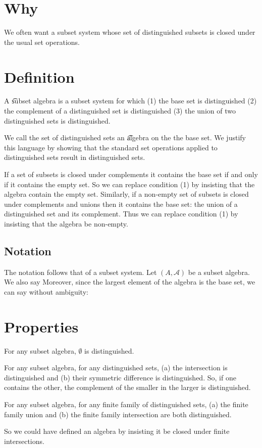 

\section*{Why}

We often want a subset system whose set of distinguished subsets is closed under the usual set operations.

\section*{Definition}

A \t{subset algebra} is a subset system for which (1) the base set is distinguished (2) the complement of a distinguished set is distinguished (3) the union of two distinguished sets is distinguished.

We call the set of distinguished sets an \t{algebra} on the the base set.
We justify this language by showing that the standard set operations applied to distinguished sets result in distinguished sets.

If a set of subsets is closed under complements it contains the base set if and only if it contains the empty set.
So we can replace condition (1) by insisting that the algebra contain the empty set.
Similarly, if a non-empty set of subsets is closed under complements and unions then it contains the base set: the union of a distinguished set and its complement.
Thus we can replace condition (1) by insisting that the algebra be non-empty.

\subsection*{Notation}

The notation follows that of a subset system.
Let $(A, \mathcal{A} )$ be a subset algebra.
We also say 
Moreover, since the largest element of the
algebra is the base set, we can say without
ambiguity: 

\section*{Properties}

\begin{proposition}
For any subset algebra, $\emptyset$ is distinguished.\end{proposition}
\begin{proposition}
For any subset algebra,
for any distinguished sets,
(a) the intersection is distinguished and
(b) their symmetric difference is distinguished.
So, if one contains the other, the complement
of the smaller in the larger is distinguished.\end{proposition}
\begin{proposition}
For any subset algebra,
for any finite family of distinguished sets,
(a) the finite family union and
(b) the finite family intersection
are both distinguished.\end{proposition}
So we could have defined an algebra
by insisting it be closed under finite
intersections.

